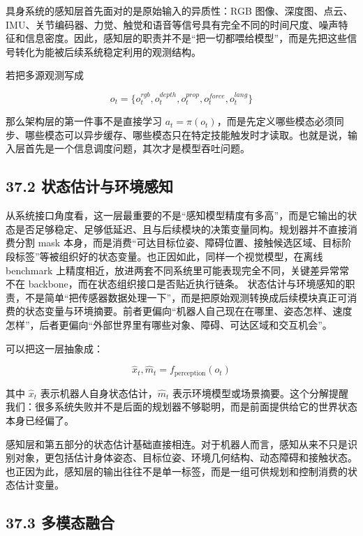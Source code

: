 具身系统的感知层首先面对的是原始输入的异质性：RGB 图像、深度图、点云、IMU、关节编码器、力觉、触觉和语音等信号具有完全不同的时间尺度、噪声特征和信息密度。因此，感知层的职责并不是“把一切都喂给模型”，而是先把这些信号转化为能被后续系统稳定利用的观测结构。

若把多源观测写成

\begingroup
\footnotesize
\begin{equation*}
o_t = \{o_t^{rgb}, o_t^{depth}, o_t^{prop}, o_t^{force}, o_t^{lang}\}
\end{equation*}
\endgroup

那么架构层的第一件事不是直接学习 \(a_t = \pi(o_t)\)，而是先定义哪些模态必须同步、哪些模态可以异步缓存、哪些模态只在特定技能触发时才读取。也就是说，输入层首先是一个信息调度问题，其次才是模型吞吐问题。

\subsection*{37.2 状态估计与环境感知}


从系统接口角度看，这一层最重要的不是“感知模型精度有多高”，而是它输出的状态是否足够稳定、足够低延迟、且与后续模块的决策变量同构。规划器并不直接消费分割 mask 本身，而是消费“可达目标位姿、障碍位置、接触候选区域、目标阶段标签”等被组织好的状态变量。也正因如此，同样一个视觉模型，在离线 benchmark 上精度相近，放进两套不同系统里可能表现完全不同，关键差异常常不在 backbone，而在状态组织接口是否贴近执行链条。 状态估计与环境感知的职责，不是简单“把传感器数据处理一下”，而是把原始观测转换成后续模块真正可消费的状态变量与环境摘要。前者更偏向“机器人自己现在在哪里、姿态怎样、速度怎样”，后者更偏向“外部世界里有哪些对象、障碍、可达区域和交互机会”。

可以把这一层抽象成：

\begin{equation*}
\hat{x}_t, \hat{m}_t = f_{\text{perception}}(o_t)
\end{equation*}

其中 \(\hat{x}_t\) 表示机器人自身状态估计，\(\hat{m}_t\) 表示环境模型或场景摘要。这个分解提醒我们：很多系统失败并不是后面的规划器不够聪明，而是前面提供给它的世界状态本身已经偏了。

感知层和第五部分的状态估计基础直接相连。对于机器人而言，感知从来不只是识别对象，更包括估计身体姿态、目标位姿、环境几何结构、动态障碍和接触状态。也正因为此，感知层的输出往往不是单一标签，而是一组可供规划和控制消费的状态估计变量。

\subsection*{37.3 多模态融合}


